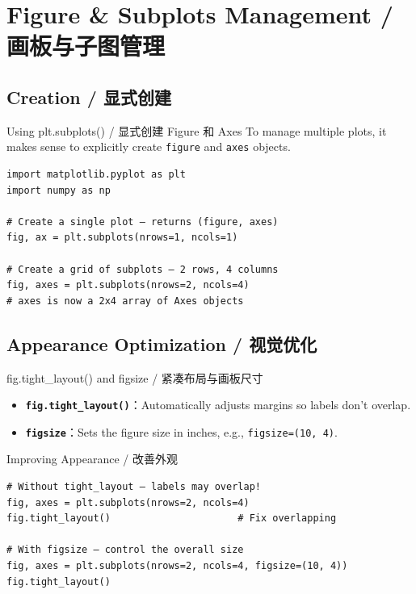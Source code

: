 \documentclass[11pt,a4paper]{article}
\begin{document}
\section{Figure \& Subplots Management / 画板与子图管理}

\subsection{Creation / 显式创建}

\begin{examplebox}{Using plt.subplots() / 显式创建 Figure 和 Axes}
    To manage multiple plots, it makes sense to explicitly create \texttt{figure} and \texttt{axes} objects.
\begin{lstlisting}
import matplotlib.pyplot as plt
import numpy as np

# Create a single plot — returns (figure, axes)
fig, ax = plt.subplots(nrows=1, ncols=1)

# Create a grid of subplots — 2 rows, 4 columns
fig, axes = plt.subplots(nrows=2, ncols=4)
# axes is now a 2x4 array of Axes objects
\end{lstlisting}
\end{examplebox}

\subsection{Appearance Optimization / 视觉优化}

\begin{concept}{fig.tight\_layout() and figsize / 紧凑布局与画板尺寸}
    \begin{itemize}[itemsep=0.5em]
        \item \textbf{\texttt{fig.tight\_layout()}}：Automatically adjusts margins so labels don't overlap.
        \item \textbf{\texttt{figsize}}：Sets the figure size in inches, e.g., \texttt{figsize=(10, 4)}.
    \end{itemize}
\end{concept}

\begin{examplebox}{Improving Appearance / 改善外观}
\begin{lstlisting}
# Without tight_layout — labels may overlap!
fig, axes = plt.subplots(nrows=2, ncols=4)
fig.tight_layout()                      # Fix overlapping

# With figsize — control the overall size
fig, axes = plt.subplots(nrows=2, ncols=4, figsize=(10, 4))
fig.tight_layout()
\end{lstlisting}
\end{examplebox}
\end{document}
